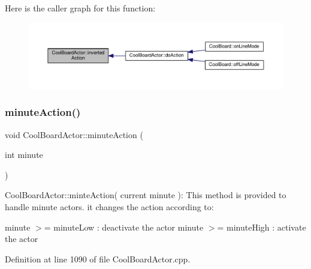 Here is the caller graph for this function\+:\nopagebreak
\begin{figure}[H]
\begin{center}
\leavevmode
\includegraphics[width=350pt]{dc/d69/class_cool_board_actor_aae82b2e62f91be009d40f93c206f9bda_icgraph}
\end{center}
\end{figure}
\mbox{\label{class_cool_board_actor_af000944ce0b9abb9c6ee4b8fe839fb36}} 
\subsubsection{\texorpdfstring{minute\+Action()}{minuteAction()}}
{\footnotesize\ttfamily void Cool\+Board\+Actor\+::minute\+Action (\begin{DoxyParamCaption}\item[{int}]{minute }\end{DoxyParamCaption})}

Cool\+Board\+Actor\+::minte\+Action( current minute )\+: This method is provided to handle minute actors. it changes the action according to\+:

minute $>$= minute\+Low \+: deactivate the actor minute $>$= minute\+High \+: activate the actor 

Definition at line 1090 of file Cool\+Board\+Actor.\+cpp.


